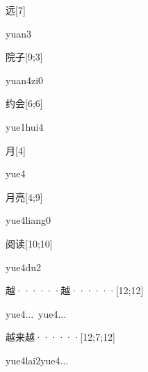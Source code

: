 \begin{verbete}[yuan3]{远}[7]
\begin{pronuncia}{yuan3}
\end{pronuncia}
\end{verbete}

\begin{verbete}[yuan4zi0]{院子}[9;3]
\begin{pronuncia}{yuan4zi0}
\end{pronuncia}
\end{verbete}

\begin{verbete}{约会}[6;6]
\begin{pronuncia}{yue1hui4}
\end{pronuncia}
\end{verbete}

\begin{verbete}[yue4]{月}[4]
\begin{pronuncia}{yue4}
\end{pronuncia}
\end{verbete}

\begin{verbete}{月亮}[4;9]
\begin{pronuncia}{yue4liang0}
\end{pronuncia}
\end{verbete}

\begin{verbete}[yue4du2]{阅读}[10;10]
\begin{pronuncia}{yue4du2}
\end{pronuncia}
\end{verbete}

\begin{verbete}{越······越······}[12;12]
\begin{pronuncia}[\\]{yue4...\ yue4...}
\end{pronuncia}
\end{verbete}

\begin{verbete}{越来越······}[12;7;12]
\begin{pronuncia}[\\]{yue4lai2yue4...}
\end{pronuncia}
\end{verbete}


